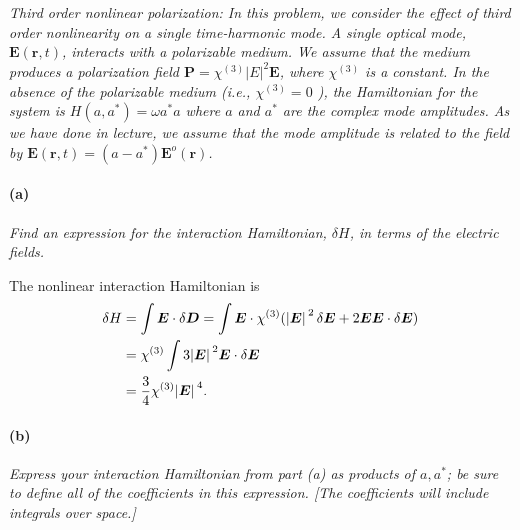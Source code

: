\documentclass[hyperref, a4paper]{article}
\begin{document}
\section{}

\subsection{}

\textit{Third order nonlinear polarization: In this problem, we consider the effect of third order nonlinearity on a single time-harmonic mode. A single optical mode, $\mathbf{E}(\mathbf{r}, t)$, interacts with a polarizable medium. We assume that the medium produces a polarization field $\mathbf{P}=\chi^{(3)}|E|^2 \mathbf{E}$, where $\chi^{(3)}$ is a constant. In the absence of the polarizable medium (i.e., $\chi^{(3)}=0$ ), the Hamiltonian for the system is $H\left(a, a^*\right)=\omega a^* a$ where $a$ and $a^*$ are the complex mode amplitudes. As we have done in lecture, we assume that the mode amplitude is related to the field by $\mathbf{E}(\mathbf{r}, t)=\left(a-a^*\right) \mathbf{E}^o(\mathbf{r})$.}

\paragraph*{(a)} \textit{Find an expression for the interaction Hamiltonian, $\delta H$, in terms of the electric fields.} 

The nonlinear interaction Hamiltonian is 
\begin{equation}
    \begin{aligned}
        \var{H} &= \int \vb*{E} \cdot \var{\vb*{D}}
        = \int \vb*{E} \cdot \chi^{(3)} (\abs*{\vb*{E}}^2 \var{\vb*{E}} + 2 \vb*{E} \vb*{E} \cdot \var{\vb*{E}}) \\
        &= \chi^{(3)} \int 3 \abs*{\vb*{E}}^2 \vb*{E} \cdot \var{\vb*{E}} \\
        &= \frac{3}{4} \chi^{(3)} \abs*{\vb*{E}}^4.
    \end{aligned}
\end{equation}

\paragraph*{(b)} \textit{Express your interaction Hamiltonian from part (a) as products of $a, a^*$; be sure to define all of the coefficients in this expression. [The coefficients will include integrals over space.]} 
\end{document}
